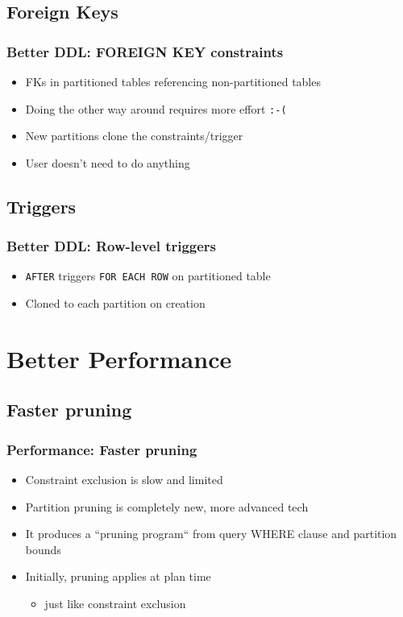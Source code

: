 \subsection{Foreign Keys}
\begin{frame}
  \frametitle{Better DDL: FOREIGN KEY constraints}
  \begin{itemize}
    \item FKs in partitioned tables referencing non-partitioned tables
    \item Doing the other way around requires more effort \texttt{:-(}
    \item New partitions clone the constraints/trigger
    \item User doesn't need to do anything
  \end{itemize}

\end{frame}

\subsection{Triggers}
\begin{frame}
  \frametitle{Better DDL: Row-level triggers}

  \begin{itemize}
    \item \texttt{AFTER} triggers \texttt{FOR EACH ROW} on partitioned table
    \item Cloned to each partition on creation
  \end{itemize}
\end{frame}

\section{Better Performance}

\subsection{Faster pruning}
\begin{frame}
  \frametitle{Performance: Faster pruning}

  \begin{itemize}
    \item Constraint exclusion is slow and limited
    \item Partition pruning is completely new, more advanced tech
    \item It produces a ``pruning program`` from query WHERE clause and partition bounds
    \item Initially, pruning applies at plan time
      \begin{itemize}
	\item just like constraint exclusion
      \end{itemize}
  \end{itemize}
\end{frame}

